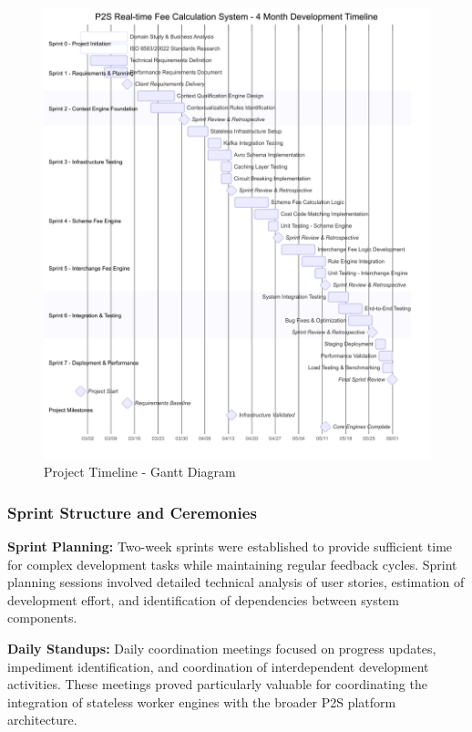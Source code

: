 \begin{figure}[H]
    \centering
    \includegraphics[width=\textwidth]{img/gantt.png}
    \caption{Project Timeline - Gantt Diagram}
    \label{fig:gantt}
\end{figure}

\subsubsection{Sprint Structure and Ceremonies}

\textbf{Sprint Planning:} Two-week sprints were established to provide sufficient time for complex development tasks while maintaining regular feedback cycles. Sprint planning sessions involved detailed technical analysis of user stories, estimation of development effort, and identification of dependencies between system components.

\textbf{Daily Standups:} Daily coordination meetings focused on progress updates, impediment identification, and coordination of interdependent development activities. These meetings proved particularly valuable for coordinating the integration of stateless worker engines with the broader P2S platform architecture.

